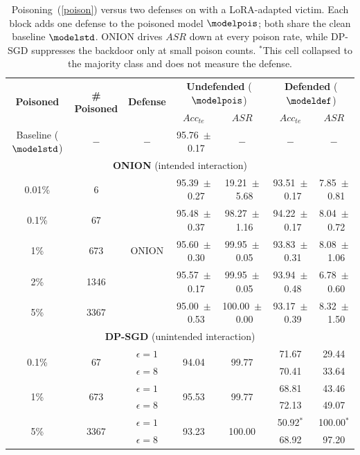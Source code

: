 \begin{table}[htb]
    \setlength\tabcolsep{4pt}
    \centering
    \footnotesize
    \caption{Poisoning~(\ref{poison}) versus two defenses on \sstwo with a
    LoRA-adapted \llama victim. Each block adds one defense to the poisoned model
    $\modelpois$; both share the clean baseline $\modelstd$. ONION drives $ASR$ down
    at every poison rate, while DP-SGD suppresses the backdoor only at small poison
    counts. $^{*}$This cell collapsed to the majority class and does not measure the
    defense.}%
    \label{tab:textbadnets_interactions}
    \begin{tabular}{ c c c c c c c }
        \bottomrule

        \toprule
        \multirow{2}{*}{\textbf{Poisoned}} & \multirow{2}{*}{\textbf{\# Poisoned}} & \multirow{2}{*}{\textbf{Defense}} & \multicolumn{2}{c}{\textbf{Undefended} ($\modelpois$)} & \multicolumn{2}{c}{\textbf{Defended} ($\modeldef$)} \\
        & & & $Acc_{te}$ & $ASR$ & $Acc_{te}$ & $ASR$ \\
        \midrule
        Baseline ($\modelstd$) & $-$ & $-$ & 95.76~$\pm$~0.17 & $-$ & $-$ & $-$ \\
        \midrule
        \multicolumn{7}{c}{\textbf{ONION} (intended interaction)} \\
        \midrule
        0.01\% & 6 & \multirow{5}{*}{ONION} & 95.39~$\pm$~0.27 & 19.21~$\pm$~5.68 & 93.51~$\pm$~0.17 & 7.85~$\pm$~0.81 \\
        0.1\% & 67 &  & 95.48~$\pm$~0.37 & 98.27~$\pm$~1.16 & 94.22~$\pm$~0.17 & 8.04~$\pm$~0.72 \\
        1\% & 673 &  & 95.60~$\pm$~0.30 & 99.95~$\pm$~0.05 & 93.83~$\pm$~0.31 & 8.08~$\pm$~1.06 \\
        2\% & 1346 &  & 95.57~$\pm$~0.17 & 99.95~$\pm$~0.05 & 93.94~$\pm$~0.48 & 6.78~$\pm$~0.60 \\
        5\% & 3367 &  & 95.00~$\pm$~0.53 & 100.00~$\pm$~0.00 & 93.17~$\pm$~0.39 & 8.32~$\pm$~1.50 \\
        \midrule
        \multicolumn{7}{c}{\textbf{DP-SGD} (unintended interaction)} \\
        \midrule
        \multirow{2}{*}{0.1\%} & \multirow{2}{*}{67} & $\epsilon = 1$ & \multirow{2}{*}{94.04} & \multirow{2}{*}{99.77} & 71.67 & 29.44 \\
         &  & $\epsilon = 8$ &  &  & 70.41 & 33.64 \\
        \multirow{2}{*}{1\%} & \multirow{2}{*}{673} & $\epsilon = 1$ & \multirow{2}{*}{95.53} & \multirow{2}{*}{99.77} & 68.81 & 43.46 \\
         &  & $\epsilon = 8$ &  &  & 72.13 & 49.07 \\
        \multirow{2}{*}{5\%} & \multirow{2}{*}{3367} & $\epsilon = 1$ & \multirow{2}{*}{93.23} & \multirow{2}{*}{100.00} & 50.92$^{*}$ & 100.00$^{*}$ \\
         &  & $\epsilon = 8$ &  &  & 68.92 & 97.20 \\
        \bottomrule

        \toprule
    \end{tabular}
\end{table}

